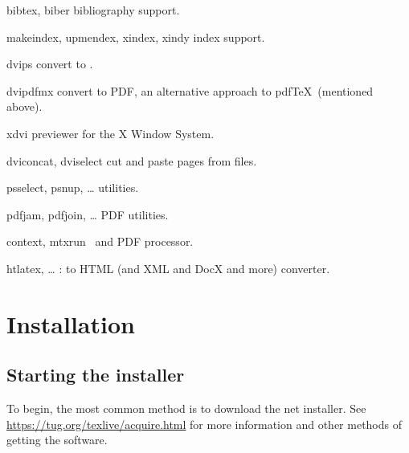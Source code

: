 \documentclass[12pt]{article}
\begin{document}
\begin{cmddescription}

\item [bibtex, biber] bibliography support.

\item [makeindex, upmendex, xindex, xindy] index support.

\item [dvips] convert \dvi{} to \PS{}.

\item [dvipdfmx] convert \dvi{} to PDF, an alternative approach
to pdf\TeX\ (mentioned above).

\item [xdvi] \dvi{} previewer for the X Window System.

\item [dviconcat, dviselect] cut and paste pages
from \dvi{} files.

\item [psselect, psnup, \ldots] \PS{} utilities.

\item [pdfjam, pdfjoin, \ldots] PDF utilities.

\item [context, mtxrun] \ConTeXt\ and PDF processor.

\item [htlatex, \ldots] : \AllTeX{} to HTML (and
XML and DocX and more) converter.

\end{cmddescription}


\section{Installation}
\label{sec:install}

\subsection{Starting the installer}
\label{sec:inst-start}

To begin, the most common method is to download the \TL{} net installer.
See \url{https://tug.org/texlive/acquire.html} for more information and
other methods of getting the software.
\end{document}
